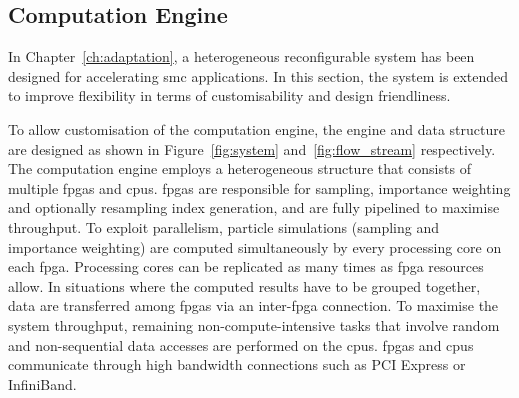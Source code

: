 \subsection{Computation Engine}
\label{sec:flow_system}

In Chapter~\ref{ch:adaptation}, a heterogeneous reconfigurable system has been designed for accelerating \gls{smc} applications.
In this section, the system is extended to improve flexibility in terms of customisability and design friendliness.

To allow customisation of the computation engine, the engine and data structure are designed as shown in Figure~\ref{fig:system} and~\ref{fig:flow_stream} respectively.
The computation engine employs a heterogeneous structure that consists of multiple \glspl{fpga} and \glspl{cpu}.
\glspl{fpga} are responsible for sampling, importance weighting and optionally resampling index generation, and are fully pipelined to maximise throughput. 
To exploit parallelism, particle simulations (sampling and importance weighting) are computed simultaneously by every processing core on each \gls{fpga}. 
Processing cores can be replicated as many times as \gls{fpga} resources allow.
In situations where the computed results have to be grouped together, data are transferred among \glspl{fpga} via an inter-\gls{fpga} connection.
To maximise the system throughput, remaining non-compute-intensive tasks that involve random and non-sequential data accesses are performed on the \glspl{cpu}.
\glspl{fpga} and \glspl{cpu} communicate through high bandwidth connections such as PCI Express or InfiniBand.

